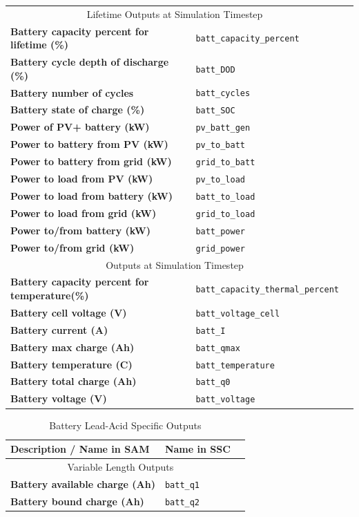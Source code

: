 \documentclass[12pt,letterpaper]{article}
\begin{document}
\begin{table}
\begin{center}
\begin{tabular}{lll}
\midrule
\multicolumn{2}{c}{Lifetime Outputs at Simulation Timestep}\\
\textbf{Battery capacity percent for lifetime (\%)} & \texttt{batt\_capacity\_percent} \\
\textbf{Battery cycle depth of discharge (\%)} & \texttt{batt\_DOD} \\
\textbf{Battery number of cycles} & \texttt{batt\_cycles} \\
\textbf{Battery state of charge (\%)} & \texttt{batt\_SOC} \\
\textbf{Power of PV+ battery (kW)} & \texttt{pv\_batt\_gen} \\
\textbf{Power to battery from PV (kW)} & \texttt{pv\_to\_batt} \\
\textbf{Power to battery from grid (kW)} & \texttt{grid\_to\_batt} \\
\textbf{Power to load from PV (kW)} & \texttt{pv\_to\_load} \\
\textbf{Power to load from battery (kW)} & \texttt{batt\_to\_load} \\
\textbf{Power to load from grid (kW)} & \texttt{grid\_to\_load} \\
\textbf{Power to/from battery (kW)} & \texttt{batt\_power} \\
\textbf{Power to/from grid (kW)} & \texttt{grid\_power} \\
\midrule
\multicolumn{2}{c}{Outputs at Simulation Timestep}\\
\textbf{Battery capacity percent for temperature(\%)} & \texttt{batt\_capacity\_thermal\_percent} \\
\textbf{Battery cell voltage (V)} & \texttt{batt\_voltage\_cell} \\
\textbf{Battery current (A)} & \texttt{batt\_I} \\
\textbf{Battery max charge (Ah)} & \texttt{batt\_qmax} \\
\textbf{Battery temperature (C)} & \texttt{batt\_temperature} \\
\textbf{Battery total charge (Ah)} & \texttt{batt\_q0} \\
\textbf{Battery voltage (V)} & \texttt{batt\_voltage} \\
\hline
\end{tabular}
\label{tab-batteryoutputs}
\end{center}
\end{table}

\begin{table}
\begin{center}
\caption{Battery Lead-Acid Specific Outputs}
\begin{tabular}{lll}
\midrule
Description / \textbf{Name in SAM} & Name in SSC \\
\midrule
\multicolumn{2}{c}{Variable Length Outputs}\\
\textbf{Battery available charge (Ah)} & \texttt{batt\_q1} \\
\textbf{Battery bound charge (Ah)} & \texttt{batt\_q2} \\
\hline
\end{tabular}
\label{tab-batteryoutputs-lead}
\end{center}
\end{table}
\end{document}
